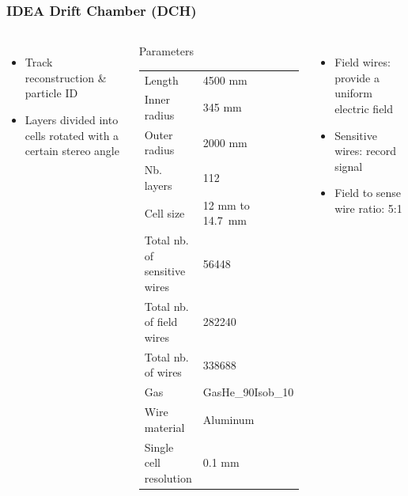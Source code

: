\documentclass[aspectratio=169, hyperref={colorlinks=true,pdfpagelabels=false,linkcolor=black}, xcolor=dvipsnames,10pt]{beamer}
\begin{document}
\begin{frame}
	\frametitle{IDEA Drift Chamber (DCH)}
	
	\begin{columns}	
	
	\begin{itemize}
	\item Track reconstruction \& particle ID
	\item Layers divided into cells rotated with a certain stereo angle
	\end{itemize}


	\begin{block}{Parameters}
  	\begin{table}
    	\begin{adjustbox}{max width=\textwidth}
    	  \begin{tabular}{l l}
    	    \toprule
        Length & 4500 mm \\ 
        Inner radius & 345 mm \\
        Outer radius & 2000 mm\\
        Nb. layers & 112 \\
        Cell size & 12 mm to 14.7~mm\\
        Total nb. of sensitive wires & 56448 \\
        Total nb. of field wires & 282240 \\
        Total nb. of wires & 338688 \\
        Gas & GasHe\_90Isob\_10 \\
        Wire material & Aluminum \\
        Single cell resolution & 0.1 mm \\
        \bottomrule
      \end{tabular}
    	\end{adjustbox}
  	\end{table}
	\end{block}


	
	\begin{itemize}
	\item Field wires: provide a uniform electric field
	\item Sensitive wires: record signal
	\item Field to sense wire ratio: 5:1
	\end{itemize}
	

\end{columns}
\end{frame}
\end{document}
